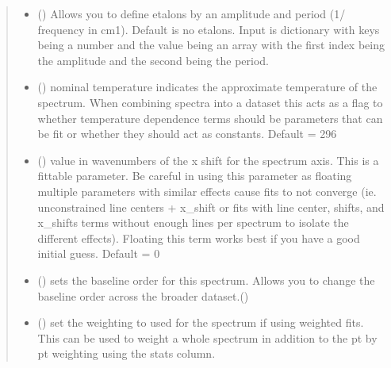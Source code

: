 \documentclass[letterpaper,10pt,english]{sphinxmanual}
\begin{document}
\begin{fulllineitems}
\begin{quote}
\begin{description}
\begin{itemize}
\item {} 
\sphinxAtStartPar
{} (\sphinxstyleliteralemphasis{\sphinxupquote{, }}) \textendash{} Allows you to define etalons by an amplitude and period (1/ frequency in cm\sphinxhyphen{}1). Default is no etalons. Input is dictionary with keys being a number and the value being an array with the first index being the amplitude and the second being the period.

\item {} 
\sphinxAtStartPar
{} (\sphinxstyleliteralemphasis{\sphinxupquote{, }}) \textendash{} nominal temperature indicates the approximate temperature of the spectrum. When combining spectra into a dataset this acts as a flag to whether temperature dependence terms should be parameters that can be fit or whether they should act as constants.  Default = 296

\item {} 
\sphinxAtStartPar
{} (\sphinxstyleliteralemphasis{\sphinxupquote{, }}) \textendash{} value in wavenumbers of the x shift for the spectrum axis. This is a fittable parameter. Be careful in using this parameter as floating multiple parameters with similar effects cause fits to not converge (ie. unconstrained line centers + x\_shift or fits with line center, shifts, and x\_shifts terms without enough lines per spectrum to isolate the different effects). Floating this term works best if you have a good initial guess. Default = 0

\item {} 
\sphinxAtStartPar
{} (\sphinxstyleliteralemphasis{\sphinxupquote{, }}) \textendash{} sets the baseline order for this spectrum. Allows you to change the baseline order across the broader dataset.()

\item {} 
\sphinxAtStartPar
{} (\sphinxstyleliteralemphasis{\sphinxupquote{, }}\sphinxstyleliteralemphasis{\sphinxupquote{,}}) \textendash{} set the weighting to used for the spectrum if using weighted fits.  This can be used to weight a whole spectrum in addition to the pt by pt weighting using the stats column.


\end{itemize}
\end{description}
\end{quote}
\end{fulllineitems}
\end{document}
